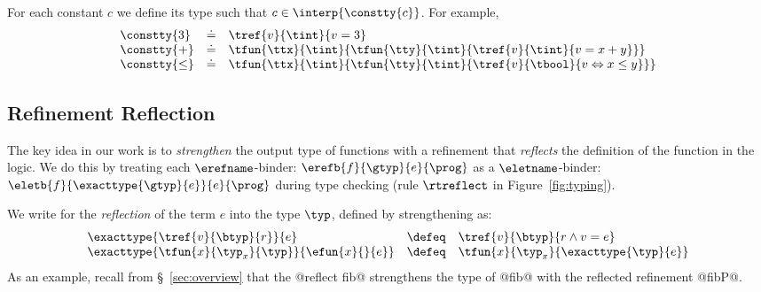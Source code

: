 For each constant $c$ we define its type 
such that $c \in \interp{\constty{c}}$.
%
For example,
%
$$
\begin{array}{lcl}
\constty{3} &\doteq& \tref{v}{\tint}{v = 3}\\
\constty{+} &\doteq& \tfun{\ttx}{\tint}{\tfun{\tty}{\tint}{\tref{v}{\tint}{v = x + y}}}\\
\constty{\leq} &\doteq& \tfun{\ttx}{\tint}{\tfun{\tty}{\tint}{\tref{v}{\tbool}{v \Leftrightarrow x \leq y}}}\\
\end{array}
$$
%

\subsection{Refinement Reflection}\label{subsec:logicalannotations}
%
The key idea in our work is to
\emph{strengthen} the output type of functions
with a refinement that \emph{reflects} the
definition of the function in the logic.
%
We do this by treating each
%
$\erefname$-binder:
%
${\erefb{f}{\gtyp}{e}{\prog}}$
%
as a $\eletname$-binder:
%
${\eletb{f}{\exacttype{\gtyp}{e}}{e}{\prog}}$
%
during type checking (rule $\rtreflect$ in Figure~\ref{fig:typing}).

%
We write  for the \emph{reflection}
of the term $e$ into the type $\typ$,  defined by strengthening
\typ as:
%
$$
\begin{array}{lcl}
\exacttype{\tref{v}{\btyp}{r}}{e}
  & \defeq
  & \tref{v}{\btyp}{r \land v = e}\\
\exacttype{\tfun{x}{\typ_x}{\typ}}{\efun{x}{}{e}}
  & \defeq
  & \tfun{x}{\typ_x}{\exacttype{\typ}{e}}
\end{array}
$$
%
As an example, recall from \S~\ref{sec:overview}
that the @reflect fib@ strengthens the type of
@fib@ with the reflected refinement @fibP@.


